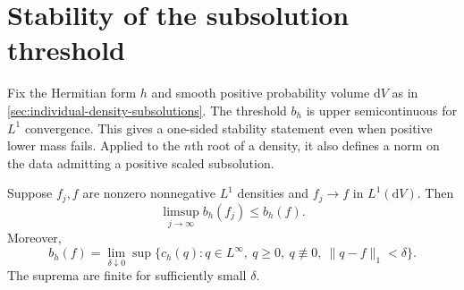 \section{Stability of the subsolution threshold}
\label{sec:individual-density-stability}

Fix the Hermitian form $h$ and smooth positive probability volume $\mathrm{d}V$ as in \cref{sec:individual-density-subsolutions}. The threshold $b_h$ is upper semicontinuous for $L^1$ convergence. This gives a one-sided stability statement even when positive lower mass fails. Applied to the $n$th root of a density, it also defines a norm on the data admitting a positive scaled subsolution.

\begin{theorem}\label{thm:individual-threshold-semicontinuity}
Suppose $f_j,f$ are nonzero nonnegative $L^1$ densities and $f_j\to f$ in $L^1(\mathrm{d}V)$. Then
\[
 \limsup_{j\to\infty}b_h(f_j)\leq b_h(f).
\]
Moreover,
\begin{equation}\label{eq:individual-threshold-relaxation}
 b_h(f)=\lim_{\delta\downarrow0}\sup\{c_h(q):q\in L^\infty,\ q\geq0,\ q\not\equiv0,
                                      \ \|q-f\|_1<\delta\}.
\end{equation}
The suprema are finite for sufficiently small $\delta$.
\end{theorem}
